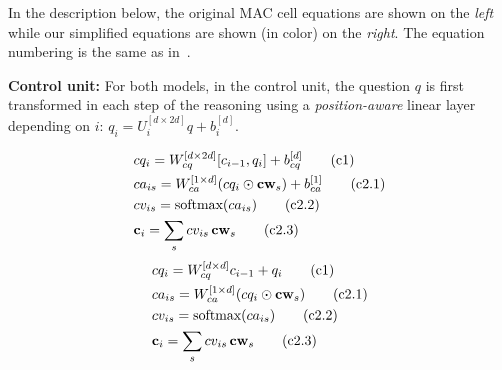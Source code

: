 In the description below, the original MAC cell equations are shown on the \emph{left}
while our simplified equations are shown (in color) on the {\color{Plum} \emph{right}}.
The equation numbering is the same as in~\cite{hudson2018compositional}.


\noindent\textbf{Control unit:} 
For both models, in the control unit, the question $q$ is first transformed in each step of 
the reasoning using a \emph{position-aware}
linear layer depending on $i$: $q_i = U_i^{[d \times 2d]} q + b_i^{[d]}$.

\begin{multicols}{2}
	\noindent
	\begin{align*}
	&cq_i = W_{cq}^{[d \times 2d]} [c_{i-1}, q_i] + b_{cq}^{[d]}  \tag{c1} \\
	&ca_{is} = W_{ca}^{[1 \times d]} (cq_i \odot \mathbf{cw}_s) + b_{ca}^{[1]}
	\tag{c2.1}\\
	&cv_{is} = \textrm{softmax}(ca_{is}) \tag{c2.2}\\
	&\mathbf{c}_i = \sum_s cv_{is} \, \mathbf{cw}_s  \tag{c2.3}
	\end{align*}
	\columnbreak
	{\color{Plum}
	\begin{align*}
	&cq_i = W_{cq}^{[d \times d]} c_{i-1} + q_i  \tag{c1} \\
	&ca_{is} = W_{ca}^{[1 \times d]} (cq_i \odot \mathbf{cw}_s)  \tag{c2.1}\\
	&cv_{is} = \textrm{softmax}(ca_{is}) \tag{c2.2}\\
	&\mathbf{c}_i = \sum_s cv_{is} \, \mathbf{cw}_s  \tag{c2.3}
    \end{align*}}
\end{multicols}

\vskip -0.6cm

